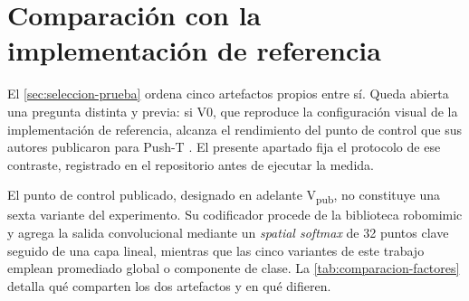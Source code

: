 \section{Comparaci\'on con la implementaci\'on de referencia}
\label{sec:comparacion-paper}

El \cref{sec:seleccion-prueba} ordena cinco artefactos propios entre s\'i. Queda abierta una
pregunta distinta y previa: si V0, que reproduce la configuraci\'on visual de la
implementaci\'on de referencia, alcanza el rendimiento del punto de control que sus autores
publicaron para Push-T \cite{chi2023diffusion}. El presente apartado fija el protocolo de
ese contraste, registrado en el repositorio antes de ejecutar la medida.


El punto de control publicado, designado en adelante V\textsubscript{pub}, no constituye una
sexta variante del experimento. Su codificador procede de la biblioteca robomimic
\cite{mandlekar2021robomimic} y agrega la salida convolucional mediante un
\textit{spatial softmax} de \num{32} puntos clave seguido de una capa lineal, mientras que
las cinco variantes de este trabajo emplean promediado global o componente de clase. La
\cref{tab:comparacion-factores} detalla qu\'e comparten los dos artefactos y en qu\'e
difieren.

